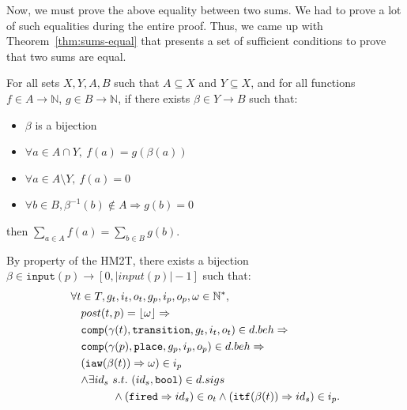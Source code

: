 \begin{pf}
\begin{itemize}
    Now, we must prove the above equality between two sums. We had to
    prove a lot of such equalities during the entire proof. Thus, we
    came up with Theorem~\ref{thm:sums-equal} that presents a set of
    sufficient conditions to prove that two sums are equal.
    
    \begin{theorem}
      \label{thm:sums-equal}
      For all sets $X,Y,A,B$ such that $A\subseteq{}X$ and
      $Y\subseteq{}X$, and for all functions
      $f\in{}A\rightarrow\mathbb{N}$, $g\in{}B\rightarrow\mathbb{N}$,
      if there exists $\beta\in{}Y\rightarrow{}B$ such that:
      \begin{itemize}
      \item $\beta$ is a bijection
      \item $\forall{}a\in{}A\cap{}Y,~f(a)=g(\beta(a))$
      \item $\forall{}a\in{}A\setminus{}Y,~f(a)=0$
      \item $\forall{}b\in{}B,\beta^{-1}(b)\notin{}A\Rightarrow{}g(b)=0$
      \end{itemize}
      then $\sum\limits_{a\in{}A}f(a)=\sum\limits_{b\in{}B}g(b)$.
    \end{theorem}
    
    By property of the HM2T, there exists a bijection
    $\beta\in\mathtt{input}(p)\rightarrow{}[0,\vert{}input(p)\vert-1]$
    such that:
    \begin{equation}
      \label{eq:bij-input}
      \begin{aligned}[t]
        \forall{}t&\in{}T,g_t,i_t,o_t,g_p,i_p,o_p,\omega\in\mathbb{N}^{*}, \\
                  & post(t,p)=\lfloor\omega\rfloor\Rightarrow \\
                  & \mathtt{comp}(\gamma(t),\mathtt{transition},g_t,i_t,o_t)\in{}d.beh\Rightarrow \\
                  & \mathtt{comp}(\gamma(p),\mathtt{place},g_p,i_p,o_p)\in{}d.beh\Rightarrow\\
                  &
                    \begin{aligned}[t]
                      & (\mathtt{iaw}(\beta(t))\Rightarrow\omega)\in{}i_p \\
                      & \begin{aligned}[t]
                          \land\exists{}id_s~&s.t.~(id_s,\mathtt{bool})\in{}d.sigs \\
                                             & \land(\mathtt{fired}\Rightarrow{}id_s)\in{}o_t\land(\mathtt{itf}(\beta(t))\Rightarrow{}id_s)\in{}i_p.\\
                        \end{aligned} \\
                    \end{aligned}
        \\
      \end{aligned}
    \end{equation}


\end{itemize}
\end{pf}
